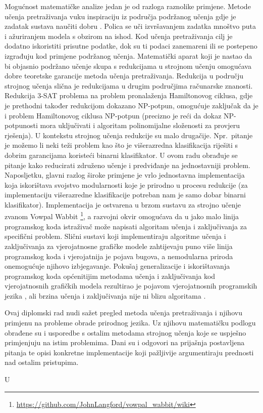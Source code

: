 Mogućnost matematičke analize jedan je od razloga raznolike primjene. Metode
učenja pretraživanja vuku inspiraciju iz područja podržanog učenja
 gdje je zadatak sustava naučiti dobru
. Polica se uči izvršavanjem
zadatka mnoštvo puta i ažuriranjem modela s obzirom na ishod. Kod učenja
pretraživanja cilj je dodatno iskoristiti prisutne podatke, dok su ti podaci
zanemareni ili se postepeno izgrađuju kod primjene podržanog učenja. Matematički
aparat koji je nastao da bi objasnio podržano učenje skupa s redukcijama u
strojnom učenju omogućava dobre teoretske garancije metoda učenja pretraživanja.
Redukcija u području strojnog učenja slična je redukcijama u drugim područjima
računarske znanosti. Redukcija 3-SAT problema na problem pronalaženja
Hamiltonovog ciklusa, gdje je prethodni također redukcijom dokazano NP-potpun,
omogućuje zaključak da je i problem Hamiltonovog ciklusa NP-potpun (precizno je
reći da dokaz NP-potpunosti mora uključivati i algoritam polinomijalne
složenosti za provjeru rješenja). U kontekstu strojnog učenja redukcije su malo
drugačije. Npr.~pitanje je možemo li neki teži problem kao što je višerazredna
klasifikacija riješiti s dobrim garancijama koristeći binarni klasifikator. U
ovom radu obrađuje se pitanje kako reducirati združeno učenje i predviđanje
 na jednostavniji problem. Naposljetku,
glavni razlog široke primjene je vrlo jednostavna implementacija koja
iskorištava svojstvo modularnosti koje je prirodno u procesu redukcije (za
implementaciju višerazredne klasifikacije potreban nam je samo dobar binarni
klasifikator). Implementacija je ostvarena u brzom sustavu za strojno učenje
zvanom Vowpal Wabbit
\footnote{\url{https://github.com/JohnLangford/vowpal_wabbit/wiki}}, a \lts{}
razvojni okvir omogućava da u jako malo linija programskog koda istraživač može
napisati algoritam učenja i zaključivanja za specifični problem. Slični sustavi
koji implementiraju algoritme učenja i zaključivanja za vjerojatnosne grafičke
modele zahtijevaju puno više linija programskog koda i vjerojatnija je pojava
bugova, a nemodularna priroda onemogućuje njihovo izbjegavanje. Pokušaj
generalizacije i iskorištavanja programskog koda općenitijim metodama učenja i
zaključivanja kod vjerojatnosnih grafičkih modela rezultirao je pojavom
vjerojatnosnih programskih jezika ,
ali brzina učenja i zaključivanja nije ni blizu algoritama \lts{}.

Ovaj diplomski rad nudi sažet pregled metoda učenja pretraživanja i njihovu
primjenu na probleme obrade prirodnog jezika. Uz njihovu matematičku podlogu
obrađene su i usporedbe s ostalim metodama strojnog učenja koje se uspješno
primjenjuju na istim problemima. Dani su i odgovori na prijašnja postavljena
pitanja te opisi konkretne implementacije koji pažljivije argumentiraju
prednosti nad ostalim pristupima.

U 
